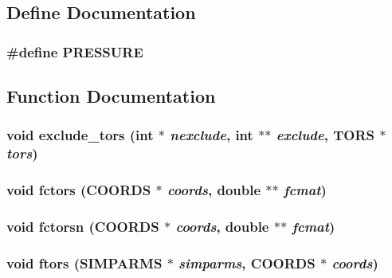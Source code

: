 \subsection{Define Documentation}
\subsubsection{\setlength{\rightskip}{0pt plus 5cm}\#define PRESSURE}\label{md__ftors_8c_67bafb91da1f123097b90c52747bcf36}




\subsection{Function Documentation}
\subsubsection{\setlength{\rightskip}{0pt plus 5cm}void exclude\_\-tors (int $\ast$ {\em nexclude}, int $\ast$$\ast$ {\em exclude}, {\bf TORS} $\ast$ {\em tors})}\label{md__ftors_8c_fac53af0e3c27b25b893f807ccb1d401}


\subsubsection{\setlength{\rightskip}{0pt plus 5cm}void fctors ({\bf COORDS} $\ast$ {\em coords}, double $\ast$$\ast$ {\em fcmat})}\label{md__ftors_8c_532a48f0444069eaefef914237df2fa7}


\subsubsection{\setlength{\rightskip}{0pt plus 5cm}void fctorsn ({\bf COORDS} $\ast$ {\em coords}, double $\ast$$\ast$ {\em fcmat})}\label{md__ftors_8c_cd3c819eb34331ce1e391407d4ec34c9}


\subsubsection{\setlength{\rightskip}{0pt plus 5cm}void ftors ({\bf SIMPARMS} $\ast$ {\em simparms}, {\bf COORDS} $\ast$ {\em coords})}\label{md__ftors_8c_b3755049af1a1086018335b57c24c1c1}


